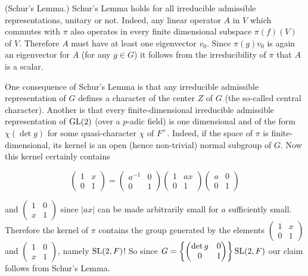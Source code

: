 \begin{remark}\label{rem:4.15}

(Schur's Lemma.) Schur's Lemma holds for all irreducible admissible representations, unitary or not. Indeed, any linear operator $A$ in $V$ which commutes with $\pi$ also operates in every finite dimensional subspace $\pi(f)(V)$ of $V$. Therefore $A$ must have at least one eigenvector $v_0$. Since $\pi(g)v_0$ is again an eigenvector for $A$ (for any $g \in G$) it follows from the irreducibility of $\pi$ that $A$ is a scalar.

One consequence of Schur's Lemma is that any irreducible admissible representation of $G$ defines a character of the center $Z$ of $G$ (the so-called central character). Another is that every finite-dimensional irreducible admissible representation of $\operatorname{GL}(2)$ (over a $p$-adic field) is one dimensional and of the form $\chi(\det g)$ for some quasi-character $\chi$ of $F^{\times}$. Indeed, if the space of $\pi$ is finite-dimensional, its kernel is an open (hence non-trivial) normal subgroup of $G$. Now this kernel certainly contains

\[
\begin{pmatrix} 1 & x \\ 0 & 1 \end{pmatrix} = \begin{pmatrix} a^{-1} & 0 \\ 0 & 1 \end{pmatrix} \begin{pmatrix} 1 & ax \\ 0 & 1 \end{pmatrix} \begin{pmatrix} a & 0 \\ 0 & 1 \end{pmatrix}
\]

and $\begin{pmatrix} 1 & 0 \\ x & 1 \end{pmatrix}$ since $|ax|$ can be made arbitrarily small for $a$ sufficiently small. Therefore the kernel of $\pi$ contains the group generated by the elements $\begin{pmatrix} 1 & x \\ 0 & 1 \end{pmatrix}$ and $\begin{pmatrix} 1 & 0 \\ x & 1 \end{pmatrix}$, namely $\operatorname{SL}(2,F)$! So since $G = \left\{\begin{pmatrix} \det g & 0 \\ 0 & 1 \end{pmatrix}\right\}\operatorname{SL}(2,F)$ our claim follows from Schur's Lemma.

\end{remark}

